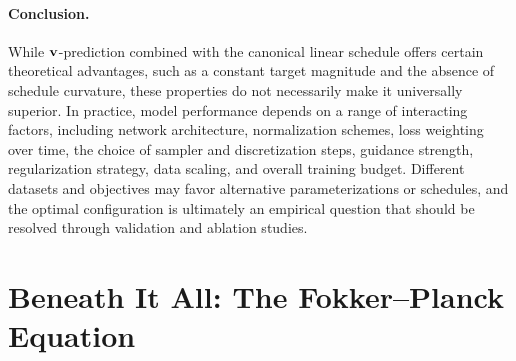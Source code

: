 \paragraph{Conclusion.}
While ${\mathbf{v}}$-prediction combined with the canonical linear schedule offers certain theoretical advantages, such as a constant target magnitude and the absence of schedule curvature, these properties do not necessarily make it universally superior. In practice, model performance depends on a range of interacting factors, including network architecture, normalization schemes, loss weighting over time, the choice of sampler and discretization steps, guidance strength, regularization strategy, data scaling, and overall training budget. Different datasets and objectives may favor alternative parameterizations or schedules, and the optimal configuration is ultimately an empirical question that should be resolved through validation and ablation studies.




\clearpage
\newpage



\section{Beneath It All: The Fokker–Planck Equation}\label{sec:comparison-connection}


